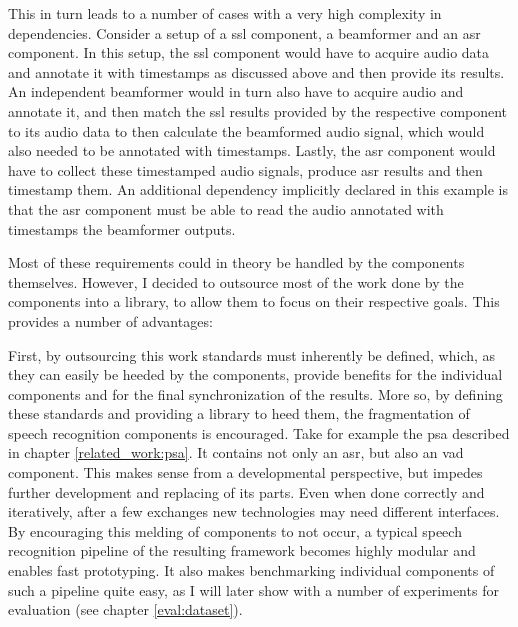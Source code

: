 This in turn leads to a number of cases with a very high complexity in dependencies.
Consider a setup of a \gls{ssl} component, a beamformer and an \gls{asr} component.
In this setup, the \gls{ssl} component would have to acquire audio data and annotate it with timestamps as discussed above and then provide its results.
An independent beamformer would in turn also have to acquire audio and annotate it, and then match the \gls{ssl} results provided by the respective component to its audio data to then calculate the beamformed audio signal, which would also needed to be annotated with timestamps.
Lastly, the \gls{asr} component would have to collect these timestamped audio signals, produce \gls{asr} results and then timestamp them.
An additional dependency implicitly declared in this example is that the \gls{asr} component must be able to read the audio annotated with timestamps the beamformer outputs.

Most of these requirements could in theory be handled by the components themselves.
However, I decided to outsource most of the work done by the components into a library, to allow them to focus on their respective goals.
This provides a number of advantages:

First, by outsourcing this work standards must inherently be defined, which, as they can easily be heeded by the components, provide benefits for the individual components and for the final synchronization of the results.
More so, by defining these standards and providing a library to heed them, the fragmentation of speech recognition components is encouraged. 
Take for example the \gls{psa} described in chapter \ref{related_work:psa}.
It contains not only an \gls{asr}, but also an \gls{vad} component.
This makes sense from a developmental perspective, but impedes further development and replacing of its parts.
Even when done correctly and iteratively, after a few exchanges new technologies may need different interfaces.
By encouraging this melding of components to not occur, a typical speech recognition pipeline of the resulting framework becomes highly modular and enables fast prototyping.
It also makes benchmarking individual components of such a pipeline quite easy, as I will later show with a number of experiments for evaluation (see chapter \ref{eval:dataset}).

